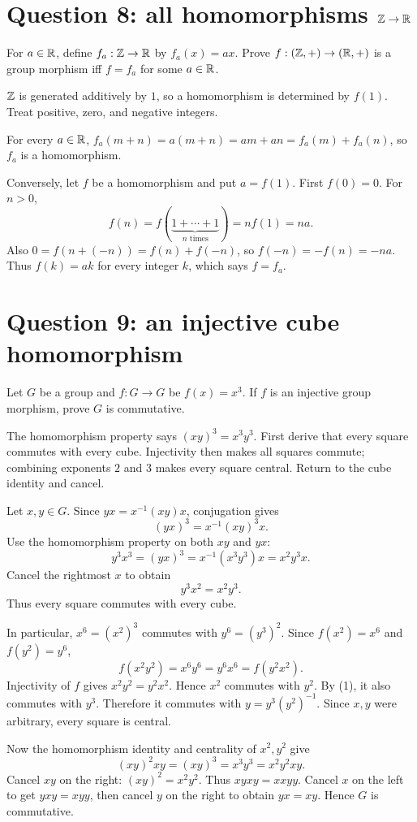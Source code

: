 \documentclass[11pt,openany]{book}
\begin{document}
\section{Question 8: all homomorphisms $\mathbb Z\to\mathbb R$}
\begin{questionbox}
For $a\in\mathbb R$, define $f_a:\mathbb Z\to\mathbb R$ by $f_a(x)=ax$. Prove $f:(\mathbb Z,+)\to(\mathbb R,+)$ is a group morphism iff $f=f_a$ for some $a\in\mathbb R$.
\end{questionbox}
\begin{approachbox}
$\mathbb Z$ is generated additively by $1$, so a homomorphism is determined by $f(1)$. Treat positive, zero, and negative integers.
\end{approachbox}
\begin{solutionbox}
For every $a\in\mathbb R$,
$f_a(m+n)=a(m+n)=am+an=f_a(m)+f_a(n)$, so $f_a$ is a homomorphism.

Conversely, let $f$ be a homomorphism and put $a=f(1)$. First $f(0)=0$. For $n>0$,
\[
f(n)=f(\underbrace{1+\cdots+1}_{n\text{ times}})=nf(1)=na.
\]
Also $0=f(n+(-n))=f(n)+f(-n)$, so $f(-n)=-f(n)=-na$. Thus $f(k)=ak$ for every integer $k$, which says $f=f_a$.
\end{solutionbox}
\section{Question 9: an injective cube homomorphism}
\begin{questionbox}
Let $G$ be a group and $f:G\to G$ be $f(x)=x^3$. If $f$ is an injective group morphism, prove $G$ is commutative.
\end{questionbox}
\begin{approachbox}
The homomorphism property says $(xy)^3=x^3y^3$. First derive that every square commutes with every cube. Injectivity then makes all squares commute; combining exponents $2$ and $3$ makes every square central. Return to the cube identity and cancel.
\end{approachbox}
\begin{solutionbox}
Let $x,y\in G$. Since $yx=x^{-1}(xy)x$, conjugation gives
\[
(yx)^3=x^{-1}(xy)^3x.
\]
Use the homomorphism property on both $xy$ and $yx$:
\[
y^3x^3=(yx)^3=x^{-1}(x^3y^3)x=x^2y^3x.
\]
Cancel the rightmost $x$ to obtain
\[
y^3x^2=x^2y^3. \tag{1}
\]
Thus every square commutes with every cube.

In particular, $x^6=(x^2)^3$ commutes with $y^6=(y^3)^2$. Since $f(x^2)=x^6$ and $f(y^2)=y^6$,
\[
f(x^2y^2)=x^6y^6=y^6x^6=f(y^2x^2).
\]
Injectivity of $f$ gives $x^2y^2=y^2x^2$. Hence $x^2$ commutes with $y^2$. By (1), it also commutes with $y^3$. Therefore it commutes with
$y=y^3(y^2)^{-1}$. Since $x,y$ were arbitrary, every square is central.

Now the homomorphism identity and centrality of $x^2,y^2$ give
\[
(xy)^2xy=(xy)^3=x^3y^3=x^2y^2xy.
\]
Cancel $xy$ on the right: $(xy)^2=x^2y^2$. Thus $xyxy=xxyy$. Cancel $x$ on the left to get $yxy=xyy$, then cancel $y$ on the right to obtain $yx=xy$. Hence $G$ is commutative.
\end{solutionbox}
\end{document}
